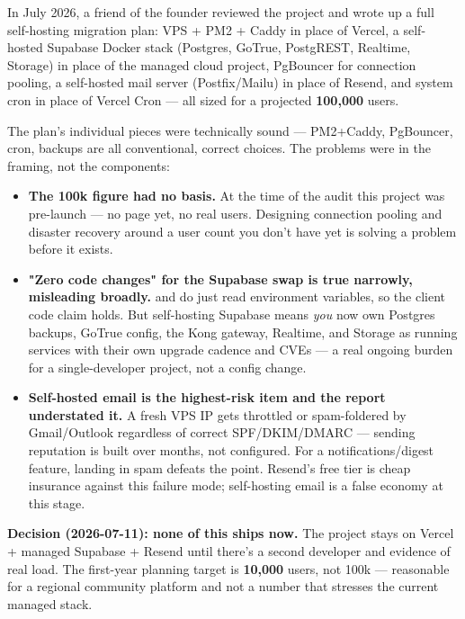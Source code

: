 In July 2026, a friend of the founder reviewed the project and wrote up a full self-hosting migration plan: VPS + PM2 + Caddy in place of Vercel, a self-hosted Supabase Docker stack (Postgres, GoTrue, PostgREST, Realtime, Storage) in place of the managed cloud project, PgBouncer for connection pooling, a self-hosted mail server (Postfix/Mailu) in place of Resend, and system cron in place of Vercel Cron — all sized for a projected \textbf{100,000} users.

\begin{olknote}
The plan's individual pieces were technically sound — PM2+Caddy, PgBouncer, cron,  backups are all conventional, correct choices. The problems were in the framing, not the components:
\begin{itemize}
  \item \textbf{The 100k figure had no basis.} At the time of the audit this project was pre-launch — no  page yet, no real users. Designing connection pooling and disaster recovery around a user count you don't have yet is solving a problem before it exists.
  \item \textbf{"Zero code changes" for the Supabase swap is true narrowly, misleading broadly.}  and  do just read environment variables, so the client code claim holds. But self-hosting Supabase means \emph{you} now own Postgres backups, GoTrue config, the Kong gateway, Realtime, and Storage as running services with their own upgrade cadence and CVEs — a real ongoing burden for a single-developer project, not a config change.
  \item \textbf{Self-hosted email is the highest-risk item and the report understated it.} A fresh VPS IP gets throttled or spam-foldered by Gmail/Outlook regardless of correct SPF/DKIM/DMARC — sending reputation is built over months, not configured. For a notifications/digest feature, landing in spam defeats the point. Resend's free tier is cheap insurance against this failure mode; self-hosting email is a false economy at this stage.
\end{itemize}
\end{olknote}

\textbf{Decision (2026-07-11): none of this ships now.} The project stays on Vercel + managed Supabase + Resend until there's a second developer and evidence of real load. The first-year planning target is \textbf{10,000} users, not 100k — reasonable for a regional community platform and not a number that stresses the current managed stack.

